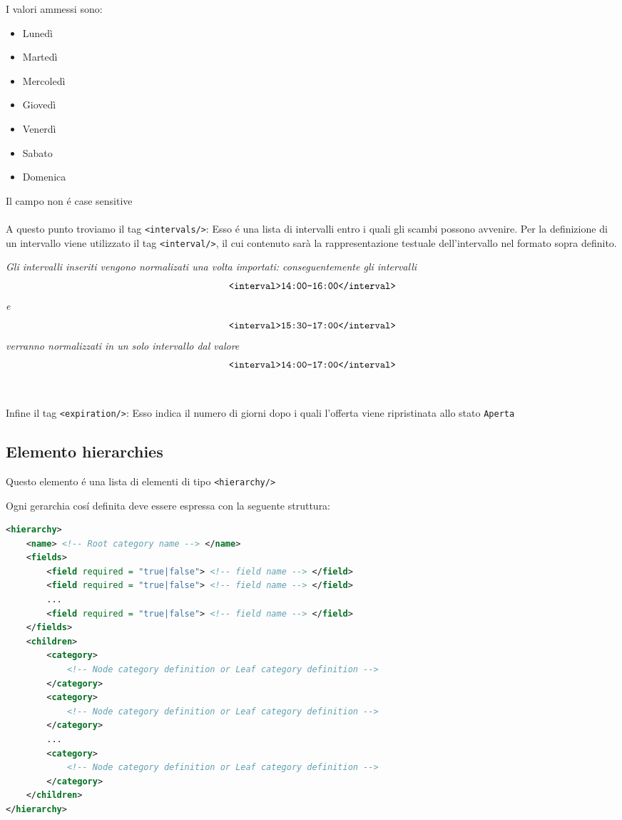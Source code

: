 I valori ammessi sono:
\begin{itemize}
        \item Lunedì
        \item Martedì
        \item Mercoledì
        \item Giovedì
        \item Venerdì
        \item Sabato
        \item Domenica
\end{itemize}
Il campo non é case sensitive
\\\\
A questo punto troviamo il tag \verb|<intervals/>|: Esso é una lista di intervalli entro i quali gli scambi possono avvenire. Per la definizione di un intervallo viene utilizzato il tag \verb|<interval/>|, il cui contenuto sarà la rappresentazione testuale dell'intervallo nel formato sopra definito.

\textit{Gli intervalli inseriti vengono normalizati una volta importati: conseguentemente gli intervalli} \[\verb|<interval>14:00-16:00</interval>|\] \textit{e} \[\verb|<interval>15:30-17:00</interval>|\] \textit{verranno normalizzati in un solo intervallo dal valore} \[\verb|<interval>14:00-17:00</interval>|\]
\\\\
Infine il tag \verb|<expiration/>|: Esso indica il numero di giorni dopo i quali l'offerta viene ripristinata allo stato \texttt{Aperta}

\subsection{Elemento hierarchies}
Questo elemento é una lista di elementi di tipo \verb|<hierarchy/>|

Ogni gerarchia cosí definita deve essere espressa con la seguente struttura:

\begin{lstlisting}[language=XML]
<hierarchy>
    <name> <!-- Root category name --> </name>
    <fields>
        <field required = "true|false"> <!-- field name --> </field>
        <field required = "true|false"> <!-- field name --> </field>
        ...
        <field required = "true|false"> <!-- field name --> </field>
    </fields>
    <children>
        <category>
            <!-- Node category definition or Leaf category definition -->
        </category>
        <category>
            <!-- Node category definition or Leaf category definition -->
        </category>
        ...
        <category>
            <!-- Node category definition or Leaf category definition -->
        </category>
    </children>
</hierarchy>
\end{lstlisting}

